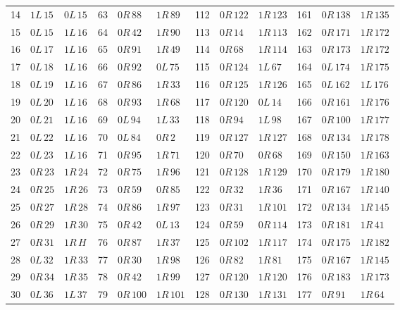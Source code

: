 \begin{longtable}{rll@{\quad}rll@{\quad}rll@{\quad}rll}
14 & $1L\,15$ & $0L\,15$ & 63 & $0R\,88$ & $1R\,89$ & 112 & $0R\,122$ & $1R\,123$ & 161 & $0R\,138$ & $1R\,135$\\
15 & $0L\,15$ & $1L\,16$ & 64 & $0R\,42$ & $1R\,90$ & 113 & $0R\,14$ & $1R\,113$ & 162 & $0R\,171$ & $1R\,172$\\
16 & $0L\,17$ & $1L\,16$ & 65 & $0R\,91$ & $1R\,49$ & 114 & $0R\,68$ & $1R\,114$ & 163 & $0R\,173$ & $1R\,172$\\
17 & $0L\,18$ & $1L\,16$ & 66 & $0R\,92$ & $0L\,75$ & 115 & $0R\,124$ & $1L\,67$ & 164 & $0L\,174$ & $1R\,175$\\
18 & $0L\,19$ & $1L\,16$ & 67 & $0R\,86$ & $1R\,33$ & 116 & $0R\,125$ & $1R\,126$ & 165 & $0L\,162$ & $1L\,176$\\
19 & $0L\,20$ & $1L\,16$ & 68 & $0R\,93$ & $1R\,68$ & 117 & $0R\,120$ & $0L\,14$ & 166 & $0R\,161$ & $1R\,176$\\
20 & $0L\,21$ & $1L\,16$ & 69 & $0L\,94$ & $1L\,33$ & 118 & $0R\,94$ & $1L\,98$ & 167 & $0R\,100$ & $1R\,177$\\
21 & $0L\,22$ & $1L\,16$ & 70 & $0L\,84$ & $0R\,2$ & 119 & $0R\,127$ & $1R\,127$ & 168 & $0R\,134$ & $1R\,178$\\
22 & $0L\,23$ & $1L\,16$ & 71 & $0R\,95$ & $1R\,71$ & 120 & $0R\,70$ & $0R\,68$ & 169 & $0R\,150$ & $1R\,163$\\
23 & $0R\,23$ & $1R\,24$ & 72 & $0R\,75$ & $1R\,96$ & 121 & $0R\,128$ & $1R\,129$ & 170 & $0R\,179$ & $1R\,180$\\
24 & $0R\,25$ & $1R\,26$ & 73 & $0R\,59$ & $0R\,85$ & 122 & $0R\,32$ & $1R\,36$ & 171 & $0R\,167$ & $1R\,140$\\
25 & $0R\,27$ & $1R\,28$ & 74 & $0R\,86$ & $1R\,97$ & 123 & $0R\,31$ & $1R\,101$ & 172 & $0R\,134$ & $1R\,145$\\
26 & $0R\,29$ & $1R\,30$ & 75 & $0R\,42$ & $0L\,13$ & 124 & $0R\,59$ & $0R\,114$ & 173 & $0R\,181$ & $1R\,41$\\
27 & $0R\,31$ & $1R\,H$ & 76 & $0R\,87$ & $1R\,37$ & 125 & $0R\,102$ & $1R\,117$ & 174 & $0R\,175$ & $1R\,182$\\
28 & $0L\,32$ & $1R\,33$ & 77 & $0R\,30$ & $1R\,98$ & 126 & $0R\,82$ & $1R\,81$ & 175 & $0R\,167$ & $1R\,145$\\
29 & $0R\,34$ & $1R\,35$ & 78 & $0R\,42$ & $1R\,99$ & 127 & $0R\,120$ & $1R\,120$ & 176 & $0R\,183$ & $1R\,173$\\
30 & $0L\,36$ & $1L\,37$ & 79 & $0R\,100$ & $1R\,101$ & 128 & $0R\,130$ & $1R\,131$ & 177 & $0R\,91$ & $1R\,64$\\

\end{longtable}
